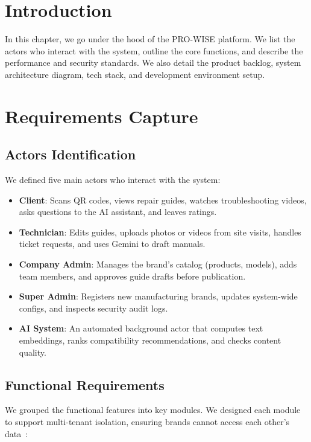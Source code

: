 \documentclass[12pt,a4paper]{report}
\begin{document}
\section{Introduction}

In this chapter, we go under the hood of the PRO-WISE platform. We list the actors who interact with the system, outline the core functions, and describe the performance and security standards. We also detail the product backlog, system architecture diagram, tech stack, and development environment setup.

\section{Requirements Capture}

\subsection{Actors Identification}

We defined five main actors who interact with the system:

\begin{itemize}
    \item \textbf{Client}: Scans QR codes, views repair guides, watches troubleshooting videos, asks questions to the AI assistant, and leaves ratings.
    \item \textbf{Technician}: Edits guides, uploads photos or videos from site visits, handles ticket requests, and uses Gemini to draft manuals.
    \item \textbf{Company Admin}: Manages the brand's catalog (products, models), adds team members, and approves guide drafts before publication.
    \item \textbf{Super Admin}: Registers new manufacturing brands, updates system-wide configs, and inspects security audit logs.
    \item \textbf{AI System}: An automated background actor that computes text embeddings, ranks compatibility recommendations, and checks content quality.
\end{itemize}

\subsection{Functional Requirements}

We grouped the functional features into key modules. We designed each module to support multi-tenant isolation, ensuring brands cannot access each other's data~\cite{mongodb_multitenant}:
\end{document}
